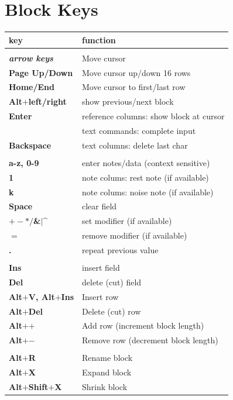 \documentclass[12pt]{report}	%
\begin{document}
\section{Block Keys}
\begin{longtable}{p{} p{} }
\textbf{key} & \textbf{function} \\
\hline
\\
\textit{\textbf{arrow keys}} & Move cursor \\
\textbf{Page Up/Down} & Move cursor up/down 16 rows\\
\textbf{Home/End} & Move cursor to first/last row\\
\textbf{Alt\(\bm{+}\)left/right} & show previous/next block \\
\textbf{Enter} & reference columns: show block at cursor \\
 & text commands: complete input \\
\textbf{Backspace} & text columns: delete last char \\
\\
\textbf{a-z, 0-9} & enter notes/data (context sensitive) \\
\textbf{1} & note colums: rest note (if available) \\
\textbf{k} & note colums: noise note (if available) \\
\textbf{Space} & clear field \\
\textbf{\(\bm{+-*/}\)\&$\vert$\textasciicircum} & set modifier (if available) \\
\textbf{\(\bm{=}\)} & remove modifier (if available) \\
\textbf{.} & repeat previous value \\
\\
\textbf{Ins} & insert field \\
\textbf{Del} & delete (cut) field \\
\textbf{Alt\(\bm{+}\)V, Alt\(\bm{+}\)Ins} & Insert row \\
\textbf{Alt\(\bm{+}\)Del} & Delete (cut) row \\
\textbf{Alt\(\bm{+}\)\(\bm{+}\)} & Add row (increment block length) \\
\textbf{Alt\(\bm{+}\)\(\bm{-}\)} & Remove row (decrement block length) \\
\\
\textbf{Alt\(\bm{+}\)R} & Rename block \\
\textbf{Alt\(\bm{+}\)X} & Expand block \\
\textbf{Alt\(\bm{+}\)Shift\(\bm{+}\)X} & Shrink block \\

\end{longtable}
\end{document}
